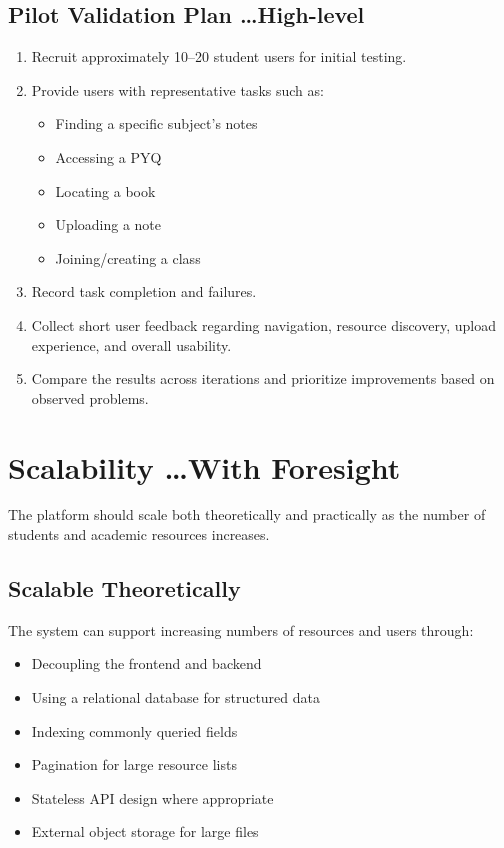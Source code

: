 \documentclass[11pt,a4paper]{article}
\begin{document}
\subsection{Pilot Validation Plan \dots High-level}
\begin{enumerate}[leftmargin=*]
    \item Recruit approximately 10--20 student users for initial testing.
    \item Provide users with representative tasks such as:
    \begin{itemize}
        \item Finding a specific subject's notes
        \item Accessing a PYQ
        \item Locating a book
        \item Uploading a note
        \item Joining/creating a class
    \end{itemize}
    \item Record task completion and failures.
    \item Collect short user feedback regarding navigation, resource discovery, upload experience, and overall usability.
    \item Compare the results across iterations and prioritize improvements based on observed problems.
\end{enumerate}

\section{Scalability \dots With Foresight}
The platform should scale both theoretically and practically as the number of students and academic resources increases.

\subsection{Scalable Theoretically}
The system can support increasing numbers of resources and users through:
\begin{itemize}[leftmargin=*]
    \item Decoupling the frontend and backend
    \item Using a relational database for structured data
    \item Indexing commonly queried fields
    \item Pagination for large resource lists
    \item Stateless API design where appropriate
    \item External object storage for large files
\end{itemize}
\end{document}
